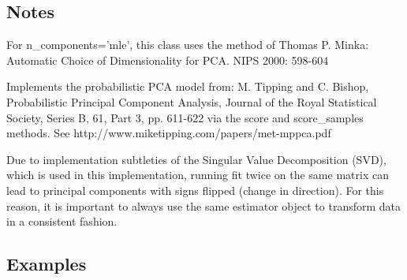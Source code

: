 \begin{frame}[fragile]
\subsection*{Notes}
For n_components=’mle’, this class uses the method of Thomas P. Minka: Automatic Choice of Dimensionality for PCA. NIPS 2000: 598-604

Implements the probabilistic PCA model from: M. Tipping and C. Bishop, Probabilistic Principal Component Analysis, Journal of the Royal Statistical Society, Series B, 61, Part 3, pp. 611-622 via the score and score_samples methods. See http://www.miketipping.com/papers/met-mppca.pdf

Due to implementation subtleties of the Singular Value Decomposition (SVD), which is used in this implementation, running fit twice on the same matrix can lead to principal components with signs flipped (change in direction). For this reason, it is important to always use the same estimator object to transform data in a consistent fashion.
\subsection*{Examples}
\begin{framed}
\begin{verbatim}


\end{verbatim}
\end{framed}
\end{frame}
